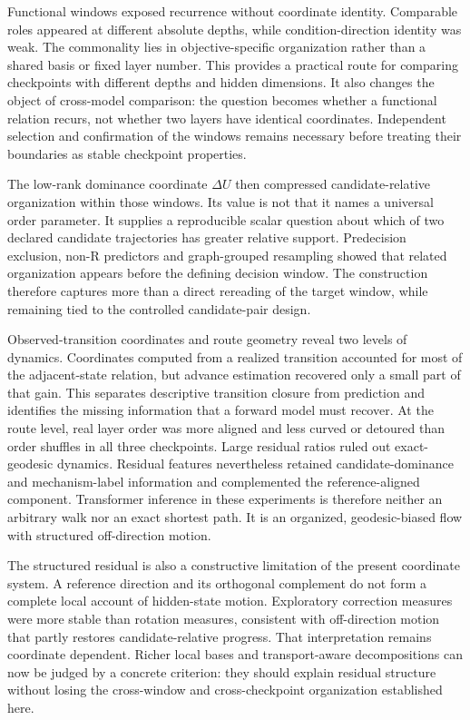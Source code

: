 \documentclass[11pt]{article}
\begin{document}
Functional windows exposed recurrence without coordinate identity. Comparable roles appeared at different absolute depths, while condition-direction identity was weak. The commonality lies in objective-specific organization rather than a shared basis or fixed layer number. This provides a practical route for comparing checkpoints with different depths and hidden dimensions. It also changes the object of cross-model comparison: the question becomes whether a functional relation recurs, not whether two layers have identical coordinates. Independent selection and confirmation of the windows remains necessary before treating their boundaries as stable checkpoint properties.

The low-rank dominance coordinate \(\Delta U\) then compressed candidate-relative organization within those windows. Its value is not that it names a universal order parameter. It supplies a reproducible scalar question about which of two declared candidate trajectories has greater relative support. Predecision exclusion, non-R predictors and graph-grouped resampling showed that related organization appears before the defining decision window. The construction therefore captures more than a direct rereading of the target window, while remaining tied to the controlled candidate-pair design.

Observed-transition coordinates and route geometry reveal two levels of dynamics. Coordinates computed from a realized transition accounted for most of the adjacent-state relation, but advance estimation recovered only a small part of that gain. This separates descriptive transition closure from prediction and identifies the missing information that a forward model must recover. At the route level, real layer order was more aligned and less curved or detoured than order shuffles in all three checkpoints. Large residual ratios ruled out exact-geodesic dynamics. Residual features nevertheless retained candidate-dominance and mechanism-label information and complemented the reference-aligned component. Transformer inference in these experiments is therefore neither an arbitrary walk nor an exact shortest path. It is an organized, geodesic-biased flow with structured off-direction motion.

The structured residual is also a constructive limitation of the present coordinate system. A reference direction and its orthogonal complement do not form a complete local account of hidden-state motion. Exploratory correction measures were more stable than rotation measures, consistent with off-direction motion that partly restores candidate-relative progress. That interpretation remains coordinate dependent. Richer local bases and transport-aware decompositions can now be judged by a concrete criterion: they should explain residual structure without losing the cross-window and cross-checkpoint organization established here.
\end{document}
